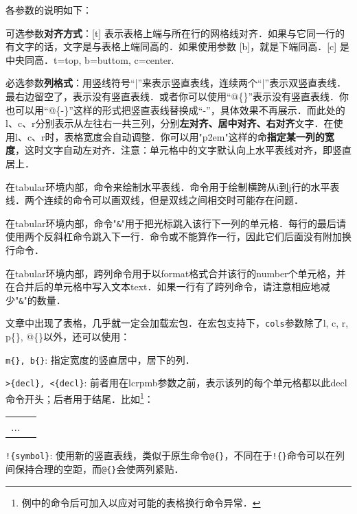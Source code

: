 各参数的说明如下：
\begin{feai}
\item 可选参数\textbf{对齐方式}：[t] 表示表格上端与所在行的网格线对齐．如果与它同一行的有文字的话，文字是与表格上端同高的．如果使用参数 [b]，就是下端同高．[c] 是中央同高．t=top, b=buttom, c=center.
\item 必选参数\textbf{列格式}：用竖线符号“|”来表示竖直表线，连续两个“|”表示双竖直表线．最右边留空了，表示没有竖直表线．或者你可以使用“@\{\}”表示没有竖直表线．你也可以用“@\{-\}”这样的形式把竖直表线替换成“-”，具体效果不再展示．而此处的l、c、r分别表示从左往右一共三列，分别\textbf{左对齐、居中对齐、右对齐}文字．在使用l、c、r时，表格宽度会自动调整．你可以用"p{2em}"这样的命\textbf{指定某一列的宽度}，这时文字自动左对齐．注意：单元格中的文字默认向上水平表线对齐，即竖直居上．
\item 在tabular环境内部，命令来绘制水平表线．命令用于绘制横跨从i到j行的水平表线．两个连续的命令可以画双线，但是双线之间相交时可能存在问题．
\item 在tabular环境内部，命令"\texttt{\&}"用于把光标跳入该行下一列的单元格．每行的最后请使用两个反斜杠命令跳入下一行．命令或不能算作一行，因此它们后面没有附加换行命令．
\item 在tabular环境内部，跨列命令用于以format格式合并该行的number个单元格，并在合并后的单元格中写入文本text．如果一行有了跨列命令，请注意相应地减少"\texttt{\&}"的数量．
\end{feai}

文章中出现了表格，几乎就一定会加载宏包．在宏包支持下，\texttt{cols}参数除了l, c, r, p\{\}, @\{\}以外，还可以使用：
\begin{feai}
\item \texttt{m\{\}, b\{\}}: 指定宽度的竖直居中，居下的列．
\item \verb|>{decl}, <{decl}|: 前者用在lcrpmb参数之前，表示该列的每个单元格都以此decl命令开头；后者用于结尾．比如\footnote{例中的命令后可加入以应对可能的表格换行命令异常．}：
\begin{latex}
\begin{tabular}{|>{\centering\ttfamily}p{5em}
    |>{$}c<{$}|}
...
\end{tabular}
\end{latex}
\item \verb|!{symbol}|:  使用新的竖直表线，类似于原生命令\texttt{@\{\}}，不同在于\verb|!{}|命令可以在列间保持合理的空距，而\verb|@{}|会使两列紧贴．
\end{feai}

